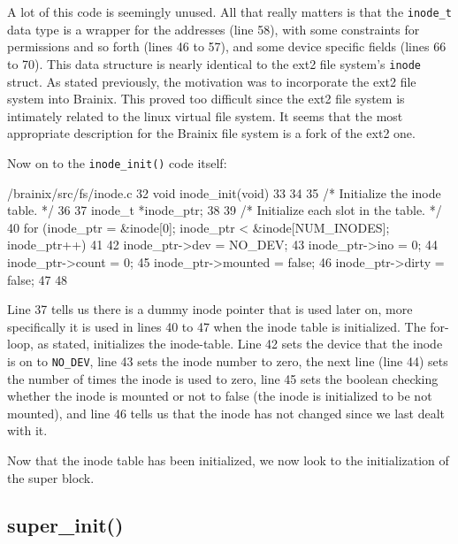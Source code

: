 \documentclass{article}
\begin{document}
A lot of this code is seemingly unused. All that really matters is that the \verb|inode_t| data type is a wrapper for the addresses (line 58), with some constraints for permissions and so forth (lines 46 to 57), and some device specific fields (lines 66 to 70). This data structure is nearly identical to the ext2 file system's \verb|inode| struct. As stated previously, the motivation was to incorporate the ext2 file system into Brainix. This proved too difficult since the ext2 file system is intimately related to the linux virtual file system. It seems that the most appropriate description for the Brainix file system is a fork of the ext2 one. 

Now on to the \verb|inode_init()| code itself:
\begin{code}{/brainix/src/fs/inode.c}
32 void inode_init(void)
33 {
34 
35 /* Initialize the inode table. */
36
37      inode_t *inode_ptr;
38
39      /* Initialize each slot in the table. */
40      for (inode_ptr = &inode[0]; inode_ptr < &inode[NUM_INODES]; inode_ptr++)
41      {
42           inode_ptr->dev = NO_DEV;
43           inode_ptr->ino = 0;
44           inode_ptr->count = 0;
45           inode_ptr->mounted = false;
46           inode_ptr->dirty = false;
47      }
48 }
\end{code}
Line 37 tells us there is a dummy inode pointer that is used later on, more specifically it is used in lines 40 to 47 when the inode table is initialized. The for-loop, as stated, initializes the inode-table. Line 42 sets the device that the inode is on to \verb|NO_DEV|, line 43 sets the inode number to zero, the next line (line 44) sets the number of times the inode is used to zero, line 45 sets the boolean checking whether the inode is mounted or not to false (the inode is initialized to be not mounted), and line 46 tells us that the inode has not changed since we last dealt with it.

Now that the inode table has been initialized, we now look to the initialization of the super block.

\subsection{super\_init()}
\end{document}
